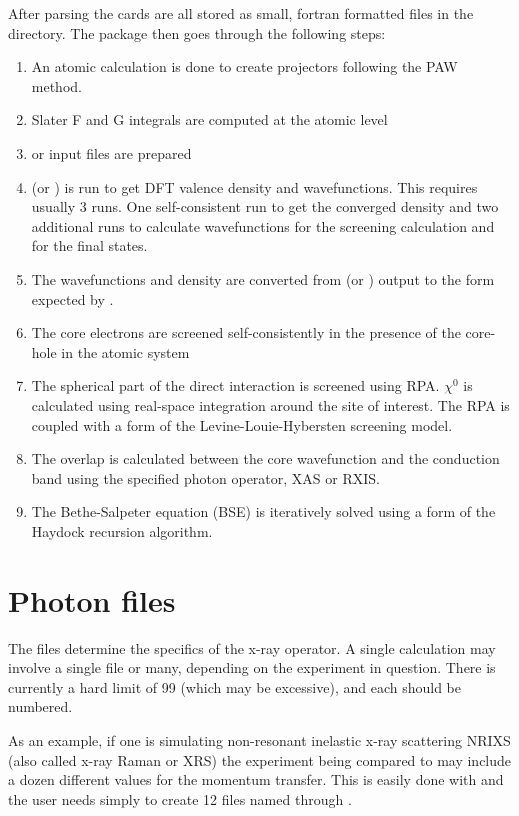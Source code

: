 \documentclass[11pt]{report}
\begin{document}
After parsing the cards are all stored as small, fortran formatted files in the  directory. The package then goes through the following steps:
\begin{enumerate}
\item An atomic calculation is done to create projectors following the PAW method.
\item Slater F and G integrals are computed at the atomic level
\item {} or  input files are prepared
\item {} (or ) is run to get DFT valence density and wavefunctions. This requires usually 3 runs. One self-consistent run to get the converged density and two additional runs to calculate wavefunctions for the screening calculation and for the final states.
\item The wavefunctions and density are converted from  (or )  output to the form expected by .
\item The core electrons are screened self-consistently in the presence of the core-hole in the atomic system
\item The spherical part of the direct interaction is screened using RPA. $\chi^0$ is calculated using real-space integration around the site of interest. The RPA is coupled with a form of the Levine-Louie-Hybersten screening model.
\item The overlap is calculated between the core wavefunction and the conduction band using the specified photon operator, XAS or RXIS.
\item The Bethe-Salpeter equation (BSE) is iteratively solved using a form of the Haydock recursion algorithm.
\end{enumerate}

\section{Photon files}
\label{photon_files}
The  files determine the specifics of the x-ray operator. A single  
calculation may involve a single  file or many, depending on the experiment in question. 
There is currently a hard limit of 99 (which may be excessive), and each should be numbered. 

As an example, if one is simulating non-resonant inelastic x-ray scattering NRIXS (also called x-ray Raman or XRS) 
the experiment being compared to may include a dozen different values for the momentum transfer. 
This is easily done with  and the user needs simply to create 12 files 
named  through .  
\end{document}
